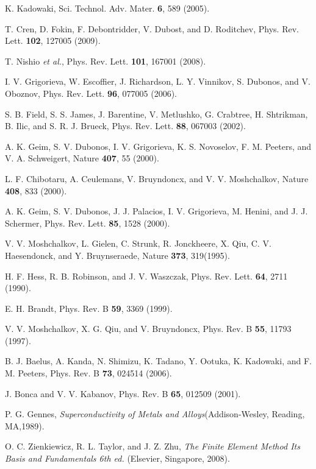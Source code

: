 \documentclass[aps,prl,showpacs,twocolumn]{revtex4}
\begin{document}
\begin{thebibliography}{99}


 K. Kadowaki, Sci. Technol. Adv. Mater. {\bf 6}, 589 (2005).

 T. Cren, D. Fokin, F. Debontridder, V. Dubost,
and D. Roditchev, Phys. Rev. Lett. {\bf 102}, 127005 (2009).

 T. Nishio {\it et al.}, Phys. Rev. Lett. {\bf 101}, 167001 (2008).

 I. V. Grigorieva, W. Escoffier, J. Richardson,
L. Y. Vinnikov, S. Dubonos, and V. Oboznov, Phys. Rev. Lett. {\bf 96}, 077005 (2006).

 S. B. Field, S. S. James, J. Barentine, V. Metlushko,
G. Crabtree, H. Shtrikman, B. Ilic, and S. R. J. Brueck, Phys. Rev. Lett. {\bf 88}, 067003 (2002).

 A. K. Geim, S. V. Dubonos, I. V. Grigorieva,
K. S. Novoselov, F. M. Peeters, and V. A. Schweigert, Nature {\bf 407}, 55 (2000).

 L. F. Chibotaru, A. Ceulemans,
V. Bruyndoncx, and V. V. Moshchalkov, Nature {\bf 408}, 833 (2000).

 A. K. Geim, S. V. Dubonos, J. J. Palacios,
I. V. Grigorieva, M. Henini, and J. J. Schermer, Phys. Rev. Lett. {\bf 85}, 1528 (2000).

 V. V. Moshchalkov, L. Gielen, C. Strunk, R. Jonckheere,
X. Qiu, C. V. Haesendonck, and Y. Bruynseraede, Nature {\bf 373}, 319(1995).

 H. F. Hess, R. B. Robinson, and J. V. Waszczak, Phys. Rev. Lett. {\bf 64}, 2711 (1990).

 E. H. Brandt, Phys. Rev. B {\bf 59}, 3369 (1999).

 V. V. Moshchalkov, X. G. Qiu, and V. Bruyndoncx, Phys. Rev. B {\bf 55}, 11793 (1997).

 B. J. Baelus, A. Kanda, N. Shimizu, K. Tadano,
Y. Ootuka, K. Kadowaki, and F. M. Peeters, Phys. Rev. B {\bf 73}, 024514
(2006).

 J. Bonca and V. V. Kabanov, Phys. Rev. B {\bf 65}, 012509
(2001).

 P. G. Gennes, \emph{Superconductivity of Metals and
Alloys}(Addison-Wesley, Reading, MA,1989).

 O. C. Zienkiewicz, R. L. Taylor, and J. Z. Zhu,
\emph{The Finite Element Method Its Basis and Fundamentals 6th ed. } (Elsevier, Singapore,
2008).


\end{thebibliography}
\end{document}
